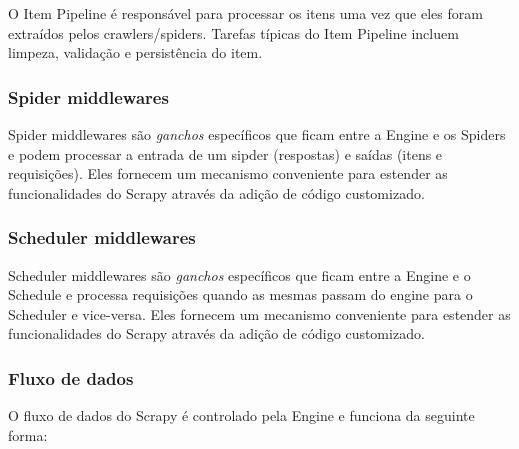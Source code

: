 O Item Pipeline é responsável para processar os itens uma vez que eles foram extraídos pelos crawlers/spiders. Tarefas típicas do Item Pipeline incluem limpeza, validação e persistência do item.


\subsubsection{Spider middlewares}

Spider middlewares são \emph{ganchos} específicos que ficam entre a Engine e os Spiders e podem processar a entrada de um sipder (respostas) e saídas (itens e requisições). Eles fornecem um mecanismo conveniente para estender as funcionalidades do Scrapy através da adição de código customizado.


\subsubsection{Scheduler middlewares}

Scheduler middlewares são \emph{ganchos} específicos que ficam entre a Engine e o Schedule e processa requisições quando as mesmas passam do engine para o Scheduler e vice-versa. Eles fornecem um mecanismo conveniente para estender as funcionalidades do Scrapy através da adição de código customizado.

\subsubsection{Fluxo de dados}

O fluxo de dados do Scrapy é controlado pela Engine e funciona da seguinte forma:

